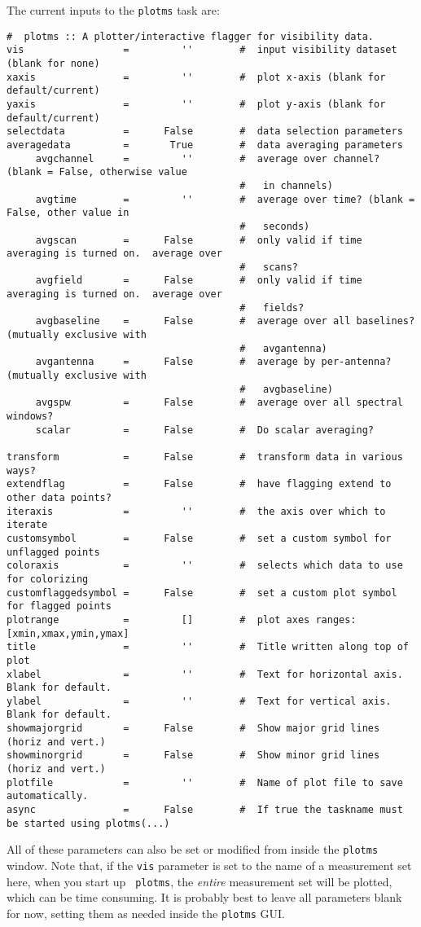 The current inputs to the {\tt plotms} task are:
\small
\begin{verbatim}
#  plotms :: A plotter/interactive flagger for visibility data.
vis                 =         ''        #  input visibility dataset (blank for none)
xaxis               =         ''        #  plot x-axis (blank for default/current)
yaxis               =         ''        #  plot y-axis (blank for default/current)
selectdata          =      False        #  data selection parameters
averagedata         =       True        #  data averaging parameters
     avgchannel     =         ''        #  average over channel?  (blank = False, otherwise value
                                        #   in channels)
     avgtime        =         ''        #  average over time? (blank = False, other value in
                                        #   seconds)
     avgscan        =      False        #  only valid if time averaging is turned on.  average over
                                        #   scans?
     avgfield       =      False        #  only valid if time averaging is turned on.  average over
                                        #   fields?
     avgbaseline    =      False        #  average over all baselines?  (mutually exclusive with
                                        #   avgantenna)
     avgantenna     =      False        #  average by per-antenna?  (mutually exclusive with
                                        #   avgbaseline)
     avgspw         =      False        #  average over all spectral windows?
     scalar         =      False        #  Do scalar averaging?

transform           =      False        #  transform data in various ways?
extendflag          =      False        #  have flagging extend to other data points?
iteraxis            =         ''        #  the axis over which to iterate
customsymbol        =      False        #  set a custom symbol for unflagged points
coloraxis           =         ''        #  selects which data to use for colorizing
customflaggedsymbol =      False        #  set a custom plot symbol for flagged points
plotrange           =         []        #  plot axes ranges: [xmin,xmax,ymin,ymax]
title               =         ''        #  Title written along top of plot
xlabel              =         ''        #  Text for horizontal axis. Blank for default.
ylabel              =         ''        #  Text for vertical axis. Blank for default.
showmajorgrid       =      False        #  Show major grid lines (horiz and vert.)
showminorgrid       =      False        #  Show minor grid lines (horiz and vert.)
plotfile            =         ''        #  Name of plot file to save automatically.
async               =      False        #  If true the taskname must be started using plotms(...)

\end{verbatim}
\normalsize All of these parameters can also be set or modified from
inside the {\tt plotms} window. Note that, if the {\tt vis} parameter
is set to the name of a measurement set here, when you start up {\tt
  plotms}, the {\it entire} measurement set will be plotted, which can
be time consuming. It is probably best to leave all parameters blank
for now, setting them as needed inside the {\tt plotms} GUI.

